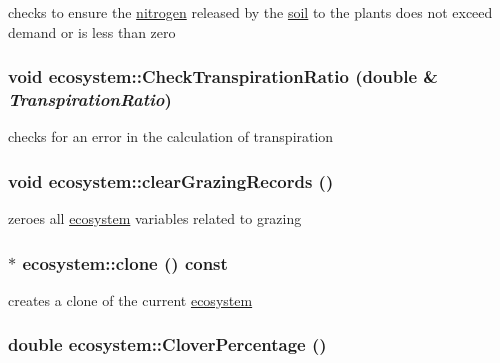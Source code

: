 checks to ensure the \hyperlink{classnitrogen}{nitrogen} released by the \hyperlink{classsoil}{soil} to the plants does not exceed demand or is less than zero \hypertarget{classecosystem_a6ae575e9cd3cadaca579108ea01be675}{
\subsubsection[{CheckTranspirationRatio}]{\setlength{\rightskip}{0pt plus 5cm}void ecosystem::CheckTranspirationRatio (double \& {\em TranspirationRatio})}}
\label{classecosystem_a6ae575e9cd3cadaca579108ea01be675}


checks for an error in the calculation of transpiration \hypertarget{classecosystem_a9c22bfb95a0505d8c17a352a47c2c743}{
\subsubsection[{clearGrazingRecords}]{\setlength{\rightskip}{0pt plus 5cm}void ecosystem::clearGrazingRecords ()}}
\label{classecosystem_a9c22bfb95a0505d8c17a352a47c2c743}


zeroes all \hyperlink{classecosystem}{ecosystem} variables related to grazing \hypertarget{classecosystem_a7d32ec71de4a7d66fb7edb4510a38f66}{
\subsubsection[{clone}]{ $\ast$ ecosystem::clone () const}}
\label{classecosystem_a7d32ec71de4a7d66fb7edb4510a38f66}


creates a clone of the current \hyperlink{classecosystem}{ecosystem} \hypertarget{classecosystem_a6278ea87551559c0f4c5deb803e13b33}{
\subsubsection[{CloverPercentage}]{\setlength{\rightskip}{0pt plus 5cm}double ecosystem::CloverPercentage ()}}
\label{classecosystem_a6278ea87551559c0f4c5deb803e13b33}


